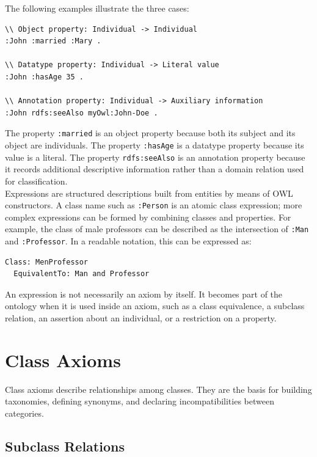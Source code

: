 \documentclass{scrbook}
\begin{document}
	The following examples illustrate the three cases:
	\begin{lstlisting}
\\ Object property: Individual -> Individual
:John :married :Mary .

\\ Datatype property: Individual -> Literal value
:John :hasAge 35 .

\\ Annotation property: Individual -> Auxiliary information
:John rdfs:seeAlso myOwl:John-Doe .
	\end{lstlisting}
	
	The property \texttt{:married} is an object property because both its subject and its object are individuals. The property \texttt{:hasAge} is a datatype property because its value is a literal. The property \texttt{rdfs:seeAlso} is an annotation property because it records additional descriptive information rather than a domain relation used for classification.\\
	
	Expressions are structured descriptions built from entities by means of OWL constructors. A class name such as \texttt{:Person} is an atomic class expression; more complex expressions can be formed by combining classes and properties. For example, the class of male professors can be described as the intersection of \texttt{:Man} and \texttt{:Professor}. In a readable notation, this can be expressed as:
	\begin{lstlisting}
Class: MenProfessor
  EquivalentTo: Man and Professor
	\end{lstlisting}
	
	An expression is not necessarily an axiom by itself. It becomes part of the ontology when it is used inside an axiom, such as a class equivalence, a subclass relation, an assertion about an individual, or a restriction on a property.
	
	\section{Class Axioms}
	
	Class axioms describe relationships among classes. They are the basis for building taxonomies, defining synonyms, and declaring incompatibilities between categories.
	
	\subsection{Subclass Relations}
	
\end{document}
